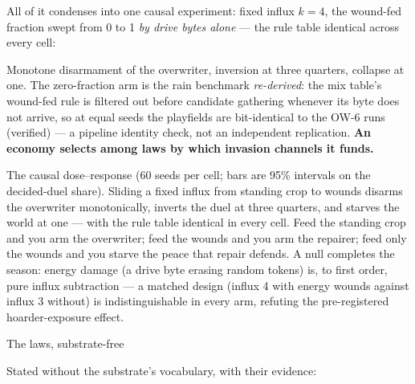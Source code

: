 All of it condenses into one causal experiment: fixed influx
$k=4$, the wound-fed fraction swept from 0 to 1 {\it by drive
bytes alone} --- the rule table identical across every cell:

\medskip
\noindent{}
\medskip

\noindent Monotone disarmament of the overwriter, inversion at
three quarters, collapse at one. The zero-fraction arm is the
rain benchmark {\it re-derived}: the mix table's wound-fed rule is
filtered out before candidate gathering whenever its byte does not
arrive, so at equal seeds the playfields are bit-identical to the
OW-6 runs (verified) --- a pipeline identity check, not an
independent replication. {\bf An economy selects among laws by
which invasion channels it funds.}

\medskip\centerline{\picw=10.5cm }
\smallskip{} The causal dose--response
(60 seeds per cell; bars are 95\% intervals on the decided-duel
share). Sliding a fixed influx from standing crop to wounds
disarms the overwriter monotonically, inverts the duel at three
quarters, and starves the world at one --- with the rule table
identical in every cell.
\medskip Feed the
standing crop and you arm the overwriter; feed the wounds and you
arm the repairer; feed only the wounds and you starve the peace
that repair defends. A null completes the season: energy damage
(a drive byte erasing random tokens) is, to first order, pure
influx subtraction --- a matched design (influx 4 with energy
wounds against influx 3 without) is indistinguishable in every
arm, refuting the pre-registered hoarder-exposure effect.

\sec The laws, substrate-free

Stated without the substrate's vocabulary, with their evidence:

